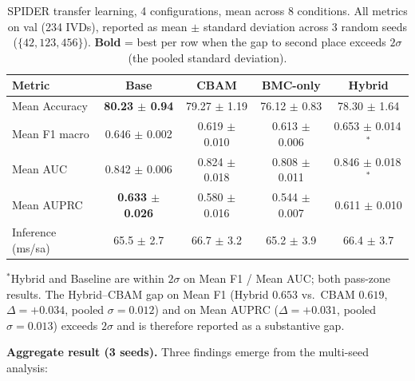 \documentclass[runningheads]{llncs}
\newcommand{\best}[1]{\textcolor{best}{\textbf{#1}}}
\begin{document}
\begin{table}[t]
\centering
\caption{SPIDER transfer learning, 4 configurations, mean across 8
conditions. All metrics on val (234 IVDs), reported as mean $\pm$
standard deviation across 3 random seeds ($\{42, 123, 456\}$).
\textbf{Bold} = best per row when the gap to second place exceeds
$2\sigma$ (the pooled standard deviation).}
\label{tab:spider_transfer_agg}
\renewcommand{\arraystretch}{1.05}
\footnotesize
\begin{tabular}{@{}lcccc@{}}
\toprule
Metric & Base & CBAM & BMC-only & Hybrid \\
\midrule
Mean Accuracy        & \best{80.23 $\pm$ 0.94} & 79.27 $\pm$ 1.19 & 76.12 $\pm$ 0.83 & 78.30 $\pm$ 1.64 \\
Mean F1 macro        & 0.646 $\pm$ 0.002 & 0.619 $\pm$ 0.010 & 0.613 $\pm$ 0.006 & 0.653 $\pm$ 0.014\,$^\ast$ \\
Mean AUC             & 0.842 $\pm$ 0.006 & 0.824 $\pm$ 0.018 & 0.808 $\pm$ 0.011 & 0.846 $\pm$ 0.018\,$^\ast$ \\
Mean AUPRC           & \best{0.633 $\pm$ 0.026} & 0.580 $\pm$ 0.016 & 0.544 $\pm$ 0.007 & 0.611 $\pm$ 0.010 \\
\midrule
Inference (ms/sa)    & 65.5 $\pm$ 2.7 & 66.7 $\pm$ 3.2 & 65.2 $\pm$ 3.9 & 66.4 $\pm$ 3.7 \\
\bottomrule
\end{tabular}

\vspace{2pt}
\par
{\raggedright\scriptsize
$^\ast$Hybrid and Baseline are within $2\sigma$ on Mean F1 / Mean AUC;
both pass-zone results. The Hybrid--CBAM gap on Mean F1 (Hybrid
$0.653$ vs.\ CBAM $0.619$, $\Delta = +0.034$, pooled $\sigma =
0.012$) and on Mean AUPRC ($\Delta = +0.031$, pooled $\sigma =
0.013$) exceeds $2\sigma$ and is therefore reported as a substantive
gap.\par}
\end{table}

\textbf{Aggregate result (3 seeds).} Three findings emerge from the
multi-seed analysis:
\end{document}
